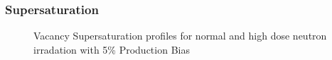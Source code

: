 \documentclass[a4paper]{article}
\begin{document}
    \newpage
    \subsubsection{Supersaturation} \hspace{10pt}
      \begin{figure}[h!]  %
        \centering
        \qquad
        \caption{Vacancy Supersaturation profiles for normal and high dose neutron irradation with 5\% Production Bias}
        \label{figure:vacancy_supersaturation_neutron_5}
      \end{figure}
\end{document}
